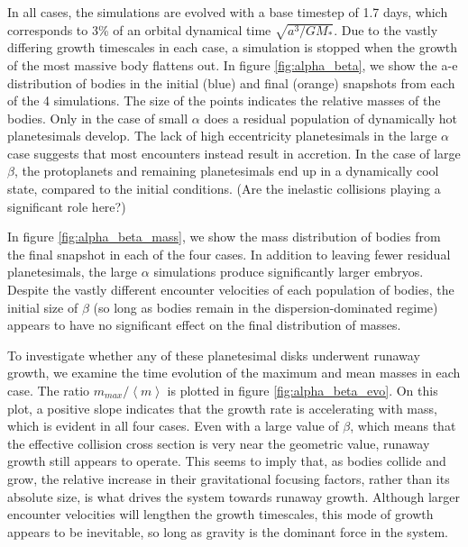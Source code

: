 \documentclass[twocolumn]{aastex63}
\begin{document}
In all cases, the simulations are evolved with a base timestep of 1.7 days, which corresponds to 3\% of an orbital dynamical time $\sqrt{a^3/G M_{*}}$. Due to the vastly differing growth timescales in each case, a simulation is stopped when the growth of the most massive body flattens out. In figure \ref{fig:alpha_beta}, we show the a-e distribution of bodies in the initial (blue) and final (orange) snapshots from each of the 4 simulations. The size of the points indicates the relative masses of the bodies. Only in the case of small $\alpha$ does a residual population of dynamically hot planetesimals develop. The lack of high eccentricity planetesimals in the large $\alpha$ case suggests that most encounters instead result in accretion. In the case of large $\beta$, the protoplanets and remaining planetesimals end up in a dynamically cool state, compared to the initial conditions. (Are the inelastic collisions playing a significant role here?)

In figure \ref{fig:alpha_beta_mass}, we show the mass distribution of bodies from the final snapshot in each of the four cases. In addition to leaving fewer residual planetesimals, the large $\alpha$ simulations produce significantly larger embryos. Despite the vastly different encounter velocities of each population of bodies, the initial size of $\beta$ (so long as bodies remain in the dispersion-dominated regime) appears to have no significant effect on the final distribution of masses.

To investigate whether any of these planetesimal disks underwent runaway growth, we examine the time evolution of the maximum and mean masses in each case. The ratio $m_{max}/\left< m \right>$ is plotted in figure \ref{fig:alpha_beta_evo}. On this plot, a positive slope indicates that the growth rate is accelerating with mass, which is evident in all four cases. Even with a large value of $\beta$, which means that the effective collision cross section is very near the geometric value, runaway growth still appears to operate. This seems to imply that, as bodies collide and grow, the relative increase in their gravitational focusing factors, rather than its absolute size, is what drives the system towards runaway growth. Although larger encounter velocities will lengthen the growth timescales, this mode of growth appears to be inevitable, so long as gravity is the dominant force in the system.
\end{document}
